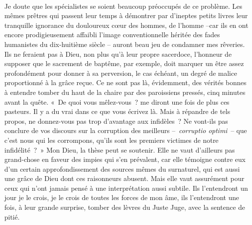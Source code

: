 \documentclass[french,twoside]{book} %
\newcommand{\astertri}{\medskip\par\centerline{\color{rubric}\large\selectfont{\syms ✻\,✻\,✻}}\medskip\par}%
\begin{document}
\astertri

\noindent  \par
Je doute que les spécialistes se soient beaucoup préoccupés de ce problème. Les mêmes prêtres qui passent leur temps à démontrer par d’ineptes petits livres leur tranquille ignorance du douloureux cœur des hommes, de l’homme –car ils en ont encore prodigieusement affaibli l’image conventionnelle héritée des fades humanistes du dix-huitième siècle – auront beau jeu de condamner mes rêveries. Ils ne feraient pas à Dieu, non plus qu’à leur propre sacerdoce, l’honneur de supposer que le sacrement de baptême, par exemple, doit marquer un être assez profondément pour donner à sa perversion, le cas échéant, un degré de malice proportionné à la grâce reçue. Ce ne sont pas là, évidemment, des vérités bonnes à entendre tomber du haut de la chaire par des paroissiens pressés, cinq minutes avant la quête. « De quoi vous mêlez-vous ? me diront une fois de plus ces pasteurs. Il y a du vrai dans ce que vous écrivez là. Mais à répandre de tels propos, ne donnez-vous pas trop d’avantage aux infidèles ? Ne vont-ils pas conclure de vos discours sur la corruption des meilleurs – \emph{corruptio optimi} – que c’est nous qui les corrompons, qu’ils sont les premiers victimes de notre infidélité ? » Mon Dieu, la thèse peut se soutenir. Elle ne vaut d’ailleurs pas grand-chose en faveur des impies qui s’en prévalent, car elle témoigne contre eux d’un certain approfondissement des sources mêmes du surnaturel, qui est aussi une grâce de Dieu dont ces raisonneurs abusent. Mais elle vaut assurément pour ceux qui n’ont jamais pensé à une interprétation aussi subtile. Ils l’entendront un jour je le crois, je le crois de toutes les forces de mon âme, ils l’entendront une fois, à leur grande surprise, tomber des lèvres du Juste Juge, avec la sentence de pitié.\par
\end{document}
